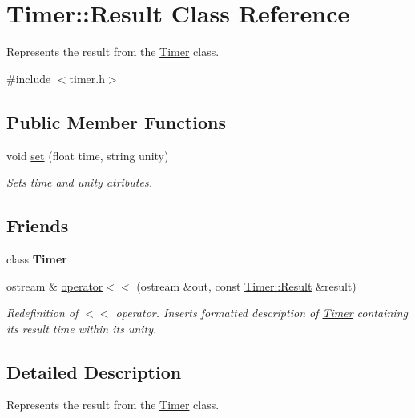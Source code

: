 \hypertarget{classTimer_1_1Result}{\section{Timer\-:\-:Result Class Reference}
\label{classTimer_1_1Result}
}


Represents the result from the \hyperlink{classTimer}{Timer} class.  




{\ttfamily \#include $<$timer.\-h$>$}

\subsection*{Public Member Functions}
\begin{DoxyCompactItemize}
\item 
void \hyperlink{classTimer_1_1Result_ab885b8f6a35e1e5e1cecf5895e7453a5}{set} (float time, string unity)
\begin{DoxyCompactList}\small\item\em Sets time and unity atributes. \end{DoxyCompactList}\end{DoxyCompactItemize}
\subsection*{Friends}
\begin{DoxyCompactItemize}
\item 
\hypertarget{classTimer_1_1Result_a50de43af5bed41f30c071d8cce0e81bc}{class {\bfseries Timer}}\label{classTimer_1_1Result_a50de43af5bed41f30c071d8cce0e81bc}

\item 
ostream \& \hyperlink{classTimer_1_1Result_a00905e20b7819b1293e4efefab7da28e}{operator$<$$<$} (ostream \&out, const \hyperlink{classTimer_1_1Result}{Timer\-::\-Result} \&result)
\begin{DoxyCompactList}\small\item\em Redefinition of $<$$<$ operator. Inserts formatted description of \hyperlink{classTimer}{Timer} containing its result time within its unity. \end{DoxyCompactList}\end{DoxyCompactItemize}


\subsection{Detailed Description}
Represents the result from the \hyperlink{classTimer}{Timer} class. 

